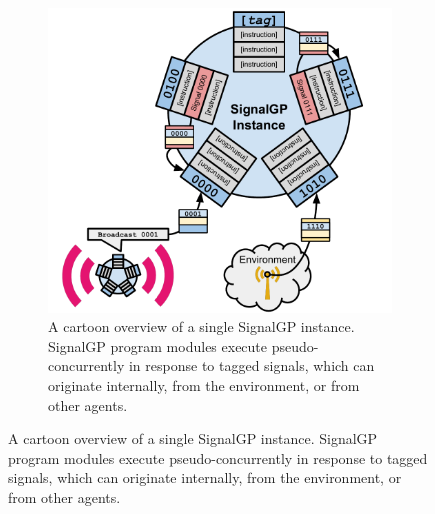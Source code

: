 \begin{figure}[!htbp]

\begin{subfigure}{\linewidth}
\centering
\includegraphics[width=\linewidth]{img/signalgp-cartoon}%
\caption{
A cartoon overview of a single SignalGP instance.
SignalGP program modules execute pseudo-concurrently in response to tagged signals, which can originate internally, from the environment, or from other agents.
}
\label{fig:signalgp-cartoon}
\end{subfigure}


\end{figure}
